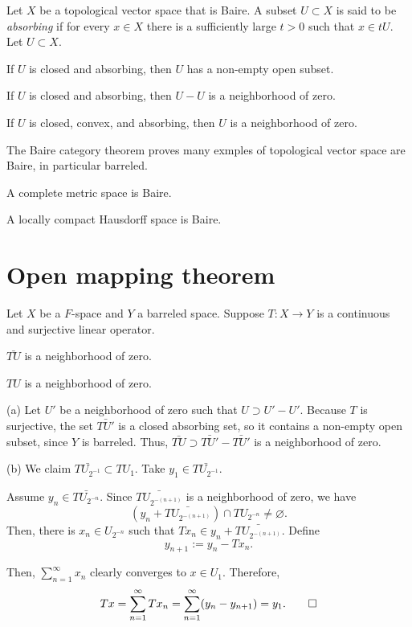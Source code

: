 \documentclass{../../large}
\begin{document}
\begin{prb}
Let $X$ be a topological vector space that is Baire.
A subset $U\subset X$ is said to be \emph{absorbing} if for every $x\in X$ there is a sufficiently large $t>0$ such that $x\in tU$.
Let $U\subset X$.
\begin{parts}
\item If $U$ is closed and absorbing, then $U$ has a non-empty open subset.
\item If $U$ is closed and absorbing, then $U-U$ is a neighborhood of zero.
\item If $U$ is closed, convex, and absorbing, then $U$ is a neighborhood of zero.
\end{parts}
\end{prb}


\begin{prb}
The Baire category theorem proves many exmples of topological vector space are Baire, in particular barreled.
\begin{parts}
\item A complete metric space is Baire.
\item A locally compact Hausdorff space is Baire.
\end{parts}
\end{prb}




\section{Open mapping theorem}

\begin{prb}
Let $X$ be a $F$-space and $Y$ a barreled space.
Suppose $T:X\to Y$ is a continuous and surjective linear operator.
\begin{parts}
\item $\bar{TU}$ is a neighborhood of zero.
\item $TU$ is a neighborhood of zero.
\end{parts}
\end{prb}

\begin{pf}
(a)
Let $U'$ be a neighborhood of zero such that $U\supset U'-U'$.
Because $T$ is surjective, the set $\bar{TU'}$ is a closed absorbing set, so it contains a non-empty open subset, since $Y$ is barreled.
Thus, $\bar{TU}\supset\bar{TU'}-\bar{TU'}$ is a neighborhood of zero.

(b)
We claim $\bar{TU_{2^{-1}}}\subset TU_1$.
Take $y_1\in\bar{TU_{2^{-1}}}$.

Assume $y_n\in\bar{TU_{2^{-n}}}$.
Since $\bar{TU_{2^{-(n+1)}}}$ is a neighborhood of zero, we have
\[(y_n+\bar{TU_{2^{-(n+1)}}})\cap TU_{2^{-n}}\ne\varnothing.\]
Then, there is $x_n\in U_{2^{-n}}$ such that $Tx_n\in y_n+\bar{TU_{2^{-(n+1)}}}$.
Define
\[y_{n+1}:=y_n-Tx_n.\]

Then, $\sum_{n=1}^\infty x_n$ clearly converges to $x\in U_1$.
Therefore,
\[Tx=\sum_{n=1}^\infty Tx_n=\sum_{n=1}^\infty(y_n-y_{n+1})=y_1.\qedhere\]
\end{pf}
\end{document}
